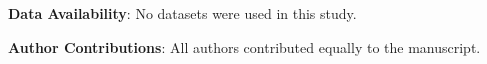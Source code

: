 \documentclass{amsart}
\numberwithin{equation}{section}
\theoremstyle{plain}
\theoremstyle{remark}
\theoremstyle{definition}
\begin{document}

 \vspace{0.3cm}

{\bf Data Availability}: No datasets were used in this study.

 \vspace{0.3cm}

{\bf Author Contributions}: All authors contributed equally to the manuscript.
\end{document}
